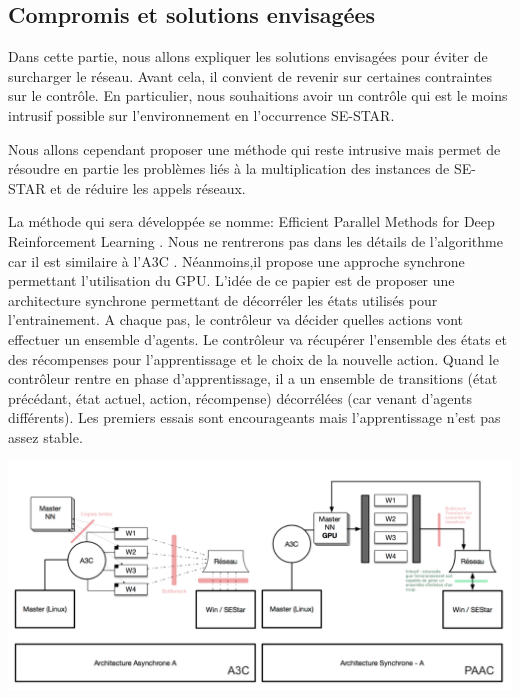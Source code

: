 \subsection{Compromis et solutions envisagées}

Dans cette partie, nous allons expliquer les solutions envisagées pour éviter de surcharger le réseau. Avant cela, il convient de revenir sur certaines contraintes sur le contrôle. En particulier, nous souhaitions avoir un contrôle qui est le moins intrusif possible sur l'environnement en l'occurrence SE-STAR.

Nous allons cependant proposer une méthode qui reste intrusive mais permet de résoudre en partie les problèmes liés à la multiplication des instances de SE-STAR et de réduire les appels réseaux. 

La méthode qui sera développée se nomme: Efficient Parallel Methods for Deep Reinforcement Learning \cite{2017arXiv170504862C}. Nous ne rentrerons pas dans les détails de l'algorithme car il est similaire à l'A3C \cite{DBLP:journals/corr/MnihBMGLHSK16}. Néanmoins,il propose une approche synchrone permettant l'utilisation du GPU. L'idée de ce papier est de proposer une architecture synchrone permettant de décorréler les états utilisés pour l'entrainement. A chaque pas, le contrôleur va décider quelles actions vont effectuer un ensemble d'agents. Le contrôleur va récupérer l'ensemble des états et des récompenses pour l'apprentissage et le choix de la nouvelle action. Quand le contrôleur rentre en phase d'apprentissage, il a un ensemble de transitions (état précédant, état actuel, action, récompense) décorrélées (car venant d'agents différents). Les premiers essais sont encourageants mais l'apprentissage n'est pas assez stable.


\begin{center}
\includegraphics[scale=.4]{./assets/interfaceReseau/paaca3c}
\end{center}


